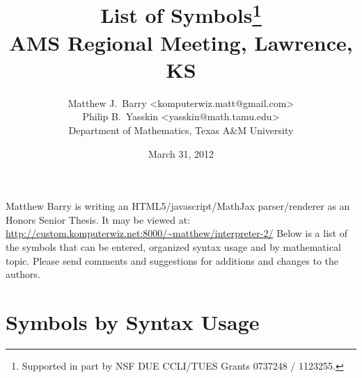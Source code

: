 \documentclass{article}
\begin{document}
  \title{List of Symbols\thanks{Supported in part by NSF DUE CCLI/TUES Grants 0737248 / 1123255.}\\
  AMS Regional Meeting, Lawrence, KS}
  \author{Matthew J.~Barry  <komputerwiz.matt@gmail.com> \\
          Philip B.~Yasskin <yasskin@math.tamu.edu>\\
          Department of Mathematics, Texas A\&M University}
  \date{March 31, 2012}
  \maketitle

  \vspace{-15 pt}

  Matthew Barry is writing an HTML5/javascript/MathJax parser/renderer as an Honors Senior Thesis. It may be viewed at: \qquad \url{http://custom.komputerwiz.net:8000/~matthew/interpreter-2/} \qquad
  Below is a list of the symbols that can be entered, organized syntax usage and by mathematical topic. Please send comments and suggestions for additions and changes to the authors.

  \vspace{-10 pt}

  \section{Symbols by Syntax Usage} %
  \label{sec:syntax}
\end{document}
